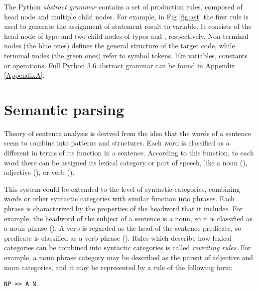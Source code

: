 The Python \emph{abstract grammar} contains a set of production rules, composed of head node and multiple child nodes. For example, in Fig \ref{fig:ast} the first rule is used to generate the assignment of statement result to variable. It consists of the head node of type  and two child nodes of types  and , respectively. Non-terminal nodes (the blue ones) defines the general structure of the target code, while terminal nodes (the green ones) refer to symbol tokens, like variables, constants or operations. Full Python 3.6 abstract grammar can be found in Appendix \ref{AppendixA}. 

\section{Semantic parsing}
Theory of sentence analysis is derived from the idea that the words of a sentence seem to combine into patterns and structures. Each word is classified as a different in terms of its function in a sentence. According to this function, to each word there can be assigned its lexical category or part of speech, like a noun (), adjective (), or verb (). 

This system could be extended to the level of syntactic categories, combining words or other syntactic categories with similar function into phrases. Each phrase is characterized by the properties of the headword that it includes. For example, the headword of the subject of a sentence is a noun, so it is classified as a noun phrase (). A verb is regarded as the head of the sentence predicate, so predicate is classified as a verb phrase (). Rules which describe how lexical categories can be combined into syntactic categories is called \emph{rewriting rules}. For example, a noun phrase category may be described as the parent of adjective and noun categories, and it may be represented by a rule of the following form:

\begin{verbatim}
NP => A N
\end{verbatim}

